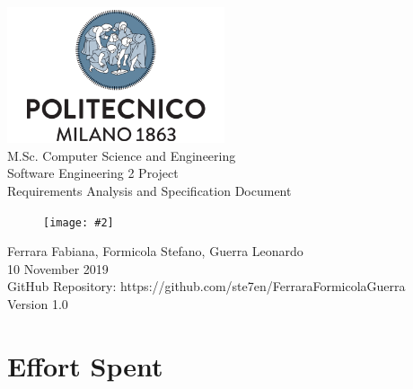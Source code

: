 \documentclass{report}
\newcommand{\image}[4]{
	\begin{figure}[H]
	\centering
	\texttt{[image: \#2]}
	\caption*{#3}
	\label{#4}

	\label{fig:nonfloat} %
	\end{figure}
}
\begin{document}
	\begin{titlepage}
		\centering	
		\vfill
		{
			\includegraphics[width =\linewidth, height = 4cm, keepaspectratio]{PolitecnicoLogo.png}
			\label{fig:PolitecnicoLogo}
			\large \\[2ex]M.Sc. Computer Science and Engineering\\
			\large Software Engineering 2 Project\\[9ex]			
			\huge Requirements Analysis and Specification Document\\[4ex]
			\image{3cm}{Images/Logo.png}{}{Logo}

			\normalsize Ferrara Fabiana, Formicola Stefano, Guerra Leonardo\\[1.5ex]
			\normalsize 10 November 2019 \\[1.5ex]
			\normalsize GitHub Repository: https://github.com/ste7en/FerraraFormicolaGuerra\\[3ex]
			\normalsize Version 1.0


		}
		
	\end{titlepage}


	
	\newpage
	\tableofcontents
	\thispagestyle{fancy}
	
	\newpage
	
	
	
	
	
		
	\chapter{Effort Spent}
	\thispagestyle{fancy}
\end{document}

